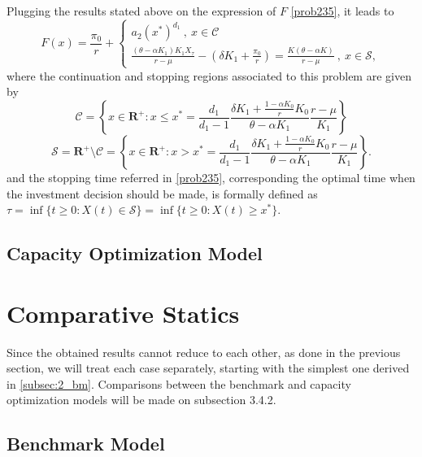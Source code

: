 Plugging the results stated above on the expression of $F$ \eqref{prob235}, it leads to
\begin{equation}
F(x)=\frac{\pi_0}{r}+\begin{cases} a_2(x^*)^{d_1} \ , \ x \in \mathcal{C} \\
\frac{(\theta-\alpha K_1)K_1 X_\tau}{r-\mu} - \left( \delta K_1  +\frac{\pi_0}{r}\right)=\frac{K(\theta-\alpha K)}{r-\mu} \ , \ x \in \mathcal{S},
\end{cases}
\end{equation}
where the continuation and stopping regions associated to this problem are given by
$$\mathcal{C}=\left\{ x \in \textbf{R}^+: x \leq x^* = \frac{d_1}{d_1-1} \frac{ \delta K_1  +\frac{1-\alpha K_0}{r}K_0 }{\theta-\alpha K_1} \frac{r-\mu}{K_1} \right\}$$
$$\mathcal{S}=\textbf{R}^+ \setminus \mathcal{C}= \left\{ x \in \textbf{R}^+: x > x^* =\frac{d_1}{d_1-1} \frac{ \delta K_1  +\frac{1-\alpha K_0}{r}K_0 }{\theta-\alpha K_1} \frac{r-\mu}{K_1} \right\}.$$
and the stopping time referred in \eqref{prob235}, corresponding the optimal time when the investment decision should be made, is formally defined as $\tau=\inf\{t\geq0: X(t) \in \mathcal{S} \}=\inf\{t\geq 0: X(t) \geq x^* \}$.




\subsection{Capacity Optimization Model}
\label{subsec:2_com}





\section{Comparative Statics}
Since the obtained results cannot reduce to each other, as done in the previous section, we will treat each case separately, starting with the simplest one derived in \ref{subsec:2_bm}.
Comparisons between the benchmark and capacity optimization models will be made on subsection 3.4.2.\\

\subsection{Benchmark Model}


